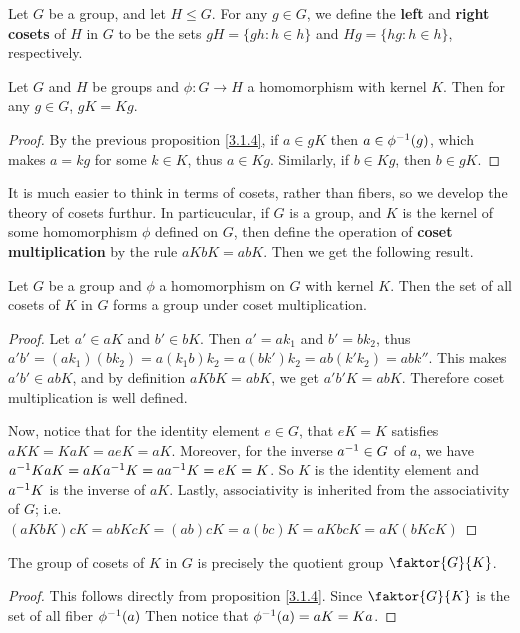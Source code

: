 \begin{definition}
  Let $G$ be a group, and let  $H \leq G$. For any  $g \in G$, we define the
  \textbf{left} and \textbf{right cosets} of $H$ in $G$ to be the sets
  $gH=\{gh : h \in h\}$ and $Hg=\{hg : h \in h\}$, respectively.
\end{definition}

\begin{proposition}\label{proposition_3.1.5}
  Let $G$ and  $H$ be groups and  $\phi:G \rightarrow H$ a homomorphism with
  kernel $K$. Then for any  $g \in G$,  $gK=Kg$.
\end{proposition}
\begin{proof}
  By the previous proposition \ref{3.1.4}, if $a \in gK$ then  $a \in \phi^{-1}(g)$,
  which makes $a=kg$ for some  $k \in K$, thus  $a \in Kg$. Similarly, if  $b
  \in Kg$, then  $b \in gK$.
\end{proof}

It is much easier to think in terms of cosets, rather than fibers, so we develop
the theory of cosets furthur. In particucular, if $G$ is a group, and  $K$ is
the kernel of some homomorphism  $\phi$ defined on  $G$, then define the
operation of  \textbf{coset multiplication} by the rule $aKbK=abK$. Then we get
the following result.

\begin{theorem}\label{theorem_3.1.6}
  Let $G$ be a group and  $\phi$ a homomorphism on $G$ with kernel  $K$. Then
  the set of all cosets of  $K$ in  $G$ forms a group under coset
  multiplication.
\end{theorem}
\begin{proof}
  Let $a' \in aK$ and  $b' \in bK$. Then  $a'=ak_1$ and $b'=bk_2$, thus
  $a'b'=(ak_1)(bk_2)=a(k_1b)k_2=a(bk')k_2=ab(k'k_2)=abk''$. This makes $a'b'
  \in abK$, and by definition  $aKbK=abK$, we get  $a'b'K=abK$. Therefore
  coset multiplication is well defined.

  Now, notice that for the identity element  $e \in G$, that $eK=K$ satisfies
  $aKK=KaK=aeK=aK$. Moreover, for the inverse  $a^{-1} \in G$ of $a$, we have
  $a^{-1}KaK=aKa^{-1}K=aa^{-1}K=eK=K$. So $K$ is the identity element and
  $a^{-1}K$ is the inverse of  $aK$. Lastly, associativity is inherited from
  the associativity of $G$; i.e.
  $(aKbK)cK=abKcK=(ab)cK=a(bc)K=aKbcK=aK(bKcK)$
\end{proof}
\begin{corollary}
  The group of cosets of $K$ in  $G$ is precisely the quotient group
  $\faktor{G}{K}$.
\end{corollary}
\begin{proof}
  This follows directly from proposition \ref{3.1.4}. Since $\faktor{G}{K}$ is the
  set of all fiber $\phi^{-1}(a)$ Then notice that $\phi^{-1}(a)=aK=Ka$.
\end{proof}

